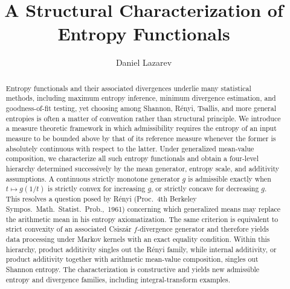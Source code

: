 \documentclass[reqno]{amsart}
\begin{document}
\newtheorem{thm}{Theorem}[section]    
\newtheorem{prop}[thm]{Proposition} 
\newtheorem{conj}[thm]{Conjecture}
\newtheorem{lem}[thm]{Lemma}
\newtheorem{cor}[thm]{Corollary}
\newtheorem{ques}[thm]{Question}

\theoremstyle{definition}
\newtheorem{definition}[thm]{Definition}
\newtheorem{example}[thm]{Example}
\newtheorem{remark}[thm]{Remark}


\def\dd{{\operatorname{d}}}


\begin{abstract}

Entropy functionals and their associated divergences underlie many statistical methods, including maximum entropy inference, minimum divergence estimation, and goodness-of-fit testing, yet choosing among Shannon, R\'enyi, Tsallis, and more general entropies is often a matter of convention rather than structural principle. We introduce a measure theoretic framework in which admissibility requires the entropy of an input measure to be bounded above by that of its reference measure whenever the former is absolutely continuous with respect to the latter. Under generalized mean-value composition, we characterize all such entropy functionals and obtain a four-level hierarchy determined successively by the mean generator, entropy scale, and additivity assumptions. A continuous strictly monotone generator $g$ is admissible exactly when $t\mapsto g(1/t)$ is strictly convex for increasing $g$, or strictly concave for decreasing $g$. This resolves a question posed by R\'enyi  (Proc.~4th Berkeley Sympos.~Math.~Statist.~Prob.,~1961) concerning which generalized means may replace the arithmetic mean in his entropy axiomatization. The same criterion is equivalent to strict convexity of an associated Csisz\'ar $f$-divergence generator and therefore yields data processing under Markov kernels with an exact equality condition. Within this hierarchy, product additivity singles out the R\'enyi family, while internal additivity, or product additivity together with arithmetic mean-value composition, singles out Shannon entropy. The characterization is constructive and yields new admissible entropy and divergence families, including integral-transform examples.
\end{abstract}


\title{A Structural Characterization of Entropy Functionals}
\author{Daniel Lazarev}
\address{Department of Mathematics, Massachusetts Institute of Technology, Cambridge, MA, USA}
\end{document}
